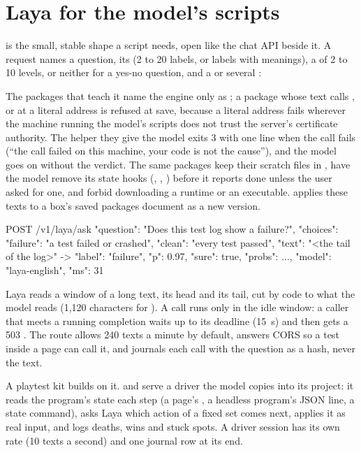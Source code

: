 \section{Laya for the model's scripts}

 is the small, stable shape a script needs, open like the chat API beside it. A request names a question, its  (2 to 20 labels, or labels with meanings), a  of 2 to 10 levels, or neither for a yes-no question, and a  or several :

The packages that teach it name the engine only as ; a package whose text calls ,  or  at a literal address is refused at save, because a literal  address fails wherever the machine running the model's scripts does not trust the server's certificate authority. The helper they give the model exits 3 with one line when the call fails (``the call failed on this machine, your code is not the cause''), and the model goes on without the verdict. The same packages keep their scratch files in , have the model remove its state hooks (, , ) before it reports done unless the user asked for one, and forbid downloading a runtime or an executable.  applies these texts to a box's saved packages document as a new version.

\begin{jsonc}
POST /v1/laya/ask
{"question": "Does this test log show a failure?",
 "choices": {"failure": "a test failed or crashed", "clean": "every test passed"},
 "text": "<the tail of the log>"}
-> {"label": "failure", "p": 0.97, "sure": true, "probs": {...}, "model": "laya-english", "ms": 31}
\end{jsonc}

Laya reads a window of a long text, its head and its tail, cut by code to what the model reads (1,120 characters for ). A call runs only in the idle window: a caller that meets a running completion waits up to its deadline (15~s) and then gets a 503 . The route allows 240 texts a minute by default, answers CORS so a test inside a page can call it, and journals each call with the question as a hash, never the text.

A playtest kit builds on it.  and  serve a driver the model copies into its project: it reads the program's state each step (a page's , a headless program's JSON line, a state command), asks Laya which action of a fixed set comes next, applies it as real input, and logs deaths, wins and stuck spots. A driver session has its own rate (10 texts a second) and one journal row at its end.

